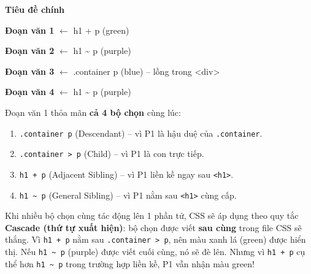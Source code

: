 \documentclass[11pt,oneside]{book}
\newcommand{\codeinline}[1]{\textcolor{accentOrange}{\texttt{#1}}}
\begin{document}
\begin{browserWindow}
\sffamily\small
{\bfseries\Large Tiêu đề chính} \par\vspace{4pt}
\textcolor{tipBorder}{\textbf{Đoạn văn 1}} \textcolor{gray!60}{\scriptsize $\leftarrow$ h1 + p (green)} \par\vspace{2pt}
\textcolor{purple!70}{\textbf{Đoạn văn 2}} \textcolor{gray!60}{\scriptsize $\leftarrow$ h1 \textasciitilde{} p (purple)} \par\vspace{2pt}
\begin{tcolorbox}[arc=2pt, colback=gray!3, colframe=gray!25, boxrule=0.5pt, boxsep=2pt, left=10pt]
\textcolor{primaryBlue}{\textbf{Đoạn văn 3}} \textcolor{gray!60}{\scriptsize $\leftarrow$ .container p (blue) -- lồng trong <div>}
\end{tcolorbox}\vspace{2pt}
\textcolor{purple!70}{\textbf{Đoạn văn 4}} \textcolor{gray!60}{\scriptsize $\leftarrow$ h1 \textasciitilde{} p (purple)}
\end{browserWindow}

\begin{noteBox}
Đoạn văn 1 thỏa mãn \textbf{cả 4 bộ chọn} cùng lúc:
\begin{enumerate}[leftmargin=1.5em, itemsep=2pt, parsep=0pt]
    \item \codeinline{.container p} (Descendant) -- vì P1 là hậu duệ của \codeinline{.container}.
    \item \codeinline{.container > p} (Child) -- vì P1 là con trực tiếp.
    \item \codeinline{h1 + p} (Adjacent Sibling) -- vì P1 liền kề ngay sau \codeinline{<h1>}.
    \item \codeinline{h1 \textasciitilde{} p} (General Sibling) -- vì P1 nằm sau \codeinline{<h1>} cùng cấp.
\end{enumerate}
Khi nhiều bộ chọn cùng tác động lên 1 phần tử, CSS sẽ áp dụng theo quy tắc \textbf{Cascade (thứ tự xuất hiện)}: bộ chọn được viết \textbf{sau cùng} trong file CSS sẽ thắng. Vì \codeinline{h1 + p} nằm sau \codeinline{.container > p}, nên màu xanh lá (green) được hiển thị. Nếu \codeinline{h1 \textasciitilde{} p} (purple) được viết cuối cùng, nó sẽ đè lên. Nhưng vì \codeinline{h1 + p} cụ thể hơn \codeinline{h1 \textasciitilde{} p} trong trường hợp liền kề, P1 vẫn nhận màu green!
\end{noteBox}
\end{document}
